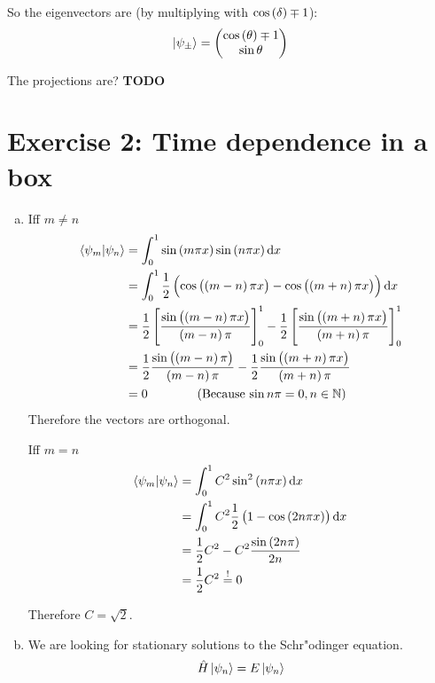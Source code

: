 \documentclass[a4paper,german,12pt,smallheadings]{scrartcl}
\begin{document}
\begin{enumerate}[a)]
    So the eigenvectors are (by multiplying with $\cos\del\delta \mp 1$):
    \begin{equation*}
    \ket{\psi_\pm} = \begin{pmatrix} \cos\del\theta \mp 1 \\ \sin\theta \end{pmatrix}
    \end{equation*}

    The projections are? \textbf{TODO}

\end{enumerate}
\section*{Exercise 2: Time dependence in a box}
\begin{enumerate}[a)]
  \item
    Iff $m \neq n$
    \begin{align*}
      \braket{\psi_m|\psi_n} &= \int_0^1 \sin\del{m \pi x} \sin\del{n \pi x} \dif x \\
                             &= \int_0^1 \frac{1}{2} \del{\cos\del{\del{m-n}\pi x} - \cos\del{\del{m+n}\pi x}} \dif x \\
                             &= \frac{1}{2} \sbr{\frac{\sin\del{\del{m-n}\pi x}}{\del{m-n} \pi}}_0^1
                                - \frac{1}{2} \sbr{\frac{\sin\del{\del{m+n}\pi x}}{\del{m+n} \pi}}_0^1 \\
                             &= \frac{1}{2} \frac{\sin\del{\del{m-n}\pi}}{\del{m-n} \pi}
                                - \frac{1}{2} \frac{\sin\del{\del{m+n}\pi x}}{\del{m+n} \pi} \\
                             &= 0 \qquad\qquad \text{(Because $\sin n \pi = 0, n \in \mathbb{N}$)}
    \end{align*}
    Therefore the vectors are orthogonal.

    Iff $m = n$
    \begin{align*}
      \braket{\psi_m|\psi_n} &= \int_0^1 C^2 \sin^2\del{n \pi x} \dif x \\
                             &= \int_0^1 C^2 \frac{1}{2}\del{1 - \cos\del{2n \pi x}} \dif x \\
                             &= \frac{1}{2}C^2 - C^2 \frac{\sin\del{2n \pi}}{2n} \\
                             &= \frac{1}{2}C^2 \overset{!}{=} 0
    \end{align*}

    Therefore $C = \sqrt{2}$.
  \item
    We are looking for stationary solutions to the Schr"odinger equation.
    \begin{align*}
      \hat H\ket{\psi_n} = E\ket{\psi_n}
    \end{align*}


\end{enumerate}
\end{document}
